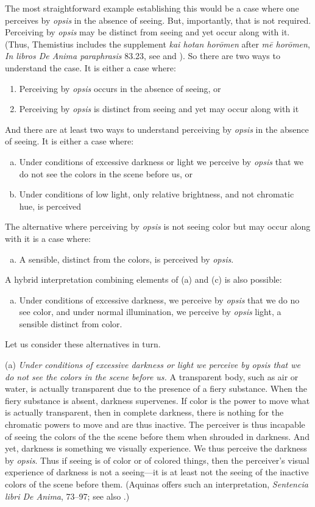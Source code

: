 The most straightforward example establishing this would be a case where one perceives by \emph{opsis} in the absence of seeing. But, importantly, that is not required. Perceiving by \emph{opsis} may be distinct from seeing and yet occur along with it. (Thus, Themistius includes the supplement \emph{kai hotan horōmen} after \emph{mē horōmen}, \emph{In libros De Anima paraphrasis} 83.23, see \citealt[105, 181 n3]{Todd:1996aa} and \citealt[238]{Browne:1986aa}). So there are two ways to understand the case. It is either a case where:
\begin{enumerate}[(1)]
	\item Perceiving by \emph{opsis} occurs in the absence of seeing, or
	\item Perceiving by \emph{opsis} is distinct from seeing and yet may occur along with it
\end{enumerate}
And there are at least two ways to understand perceiving by \emph{opsis} in the absence of seeing. It is either a case where:
\begin{enumerate}[(a)]
	\item Under conditions of excessive darkness or light we perceive by \emph{opsis} that we do not see the colors in the scene before us, or
	\item Under conditions of low light, only relative brightness, and not chromatic hue, is perceived
\end{enumerate}
The alternative where perceiving by \emph{opsis} is not seeing color but may occur along with it is a case where:
\begin{enumerate}[(c)]
	\item A sensible, distinct from the colors, is perceived by \emph{opsis}.
\end{enumerate}
A hybrid interpretation combining elements of (a) and (c) is also possible:
\begin{enumerate}[(d)]
	\item Under conditions of excessive darkness, we perceive by \emph{opsis} that we do no see color, and under normal illumination, we perceive by \emph{opsis} light, a sensible distinct from color.
\end{enumerate}
Let us consider these alternatives in turn.


(a) \emph{Under conditions of excessive darkness or light we perceive by \emph{opsis} that we do not see the colors in the scene before us.} A transparent body, such as air or water, is actually transparent due to the presence of a fiery substance. When the fiery substance is absent, darkness supervenes. If color is the power to move what is actually transparent, then in complete darkness, there is nothing for the chromatic powers to move and are thus inactive. The perceiver is thus incapable of seeing the colors of the the scene before them when shrouded in darkness. And yet, darkness is something we visually experience. We thus perceive the darkness by \emph{opsis}. Thus if seeing is of color or of colored things, then the perceiver's visual experience of darkness is not a seeing—it is at least not the seeing of the inactive colors of the scene before them. (Aquinas offers such an interpretation, \emph{Sentencia libri De Anima}, 73–97; see also \citealt[402]{Osborne:1983le}.)

